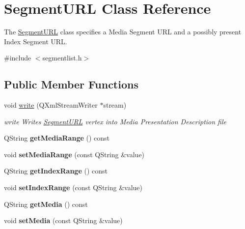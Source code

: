 \hypertarget{class_segment_u_r_l}{\section{Segment\-U\-R\-L Class Reference}
\label{class_segment_u_r_l}
}


The \hyperlink{class_segment_u_r_l}{Segment\-U\-R\-L} class specifies a Media Segment U\-R\-L and a possibly present Index Segment U\-R\-L.  




{\ttfamily \#include $<$segmentlist.\-h$>$}

\subsection*{Public Member Functions}
\begin{DoxyCompactItemize}
\item 
void \hyperlink{class_segment_u_r_l_a1b0a3323d916f75d9f049e158e1f19fb}{write} (Q\-Xml\-Stream\-Writer $\ast$stream)
\begin{DoxyCompactList}\small\item\em write Writes \hyperlink{class_segment_u_r_l}{Segment\-U\-R\-L} vertex into Media Presentation Description file \end{DoxyCompactList}\item 
\hypertarget{class_segment_u_r_l_aaff5024ceaf34af893d366c170e065a5}{Q\-String {\bfseries get\-Media\-Range} () const }\label{class_segment_u_r_l_aaff5024ceaf34af893d366c170e065a5}

\item 
\hypertarget{class_segment_u_r_l_aad5fd4b90da890311b0b5882bb912153}{void {\bfseries set\-Media\-Range} (const Q\-String \&value)}\label{class_segment_u_r_l_aad5fd4b90da890311b0b5882bb912153}

\item 
\hypertarget{class_segment_u_r_l_a151a56d23ff7259b7972a99f46746612}{Q\-String {\bfseries get\-Index\-Range} () const }\label{class_segment_u_r_l_a151a56d23ff7259b7972a99f46746612}

\item 
\hypertarget{class_segment_u_r_l_aa396e1783ada5d362e0553b56bbe8544}{void {\bfseries set\-Index\-Range} (const Q\-String \&value)}\label{class_segment_u_r_l_aa396e1783ada5d362e0553b56bbe8544}

\item 
\hypertarget{class_segment_u_r_l_a56e61174dab524ec9b76fe000a325db4}{Q\-String {\bfseries get\-Media} () const }\label{class_segment_u_r_l_a56e61174dab524ec9b76fe000a325db4}

\item 
\hypertarget{class_segment_u_r_l_a06e13abf9ddf6d11ca48935b8d62e7dc}{void {\bfseries set\-Media} (const Q\-String \&value)}\label{class_segment_u_r_l_a06e13abf9ddf6d11ca48935b8d62e7dc}

\end{DoxyCompactItemize}


